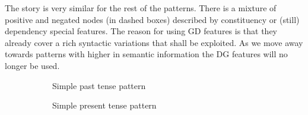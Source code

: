     The story is very similar for the rest of the patterns. There is a mixture of positive and negated nodes (in dashed boxes) described by constituency or (still) dependency special features. The reason for using GD features is that they already cover a rich syntactic variations that shall be exploited. As we move away towards patterns with higher in semantic information the DG features will no longer be used. 

    \begin{figure}[!ht]
        \centering
        \begin{subfigure}[t]{0.47\textwidth}
            \centering
            \caption{Simple past tense pattern}
            \label{fig:past-tense-pattern1}
        \end{subfigure}
        \begin{subfigure}[t]{0.47\textwidth}
            \centering
            \caption{Simple present tense pattern}
            \label{fig:present-tense-pattern1}
        \end{subfigure}
        \begin{subfigure}[t]{0.47\textwidth}
            \centering
\end{subfigure}
\end{figure}
